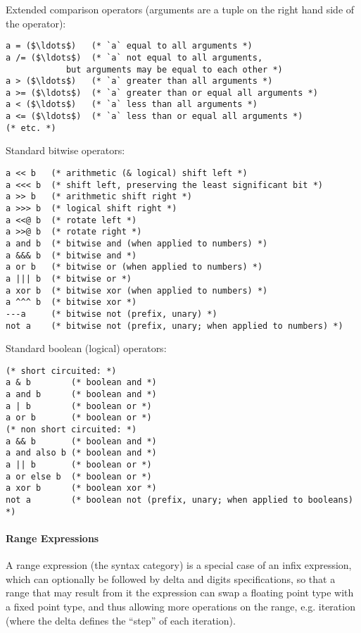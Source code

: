 Extended comparison operators (arguments are a tuple on the right hand side of the operator):
\begin{lstlisting}
a = ($\ldots$)   (* `a` equal to all arguments *)
a /= ($\ldots$)  (* `a` not equal to all arguments,
            but arguments may be equal to each other *)
a > ($\ldots$)   (* `a` greater than all arguments *)
a >= ($\ldots$)  (* `a` greater than or equal all arguments *)
a < ($\ldots$)   (* `a` less than all arguments *)
a <= ($\ldots$)  (* `a` less than or equal all arguments *)
(* etc. *)
\end{lstlisting}

Standard bitwise operators: 
\begin{lstlisting}
a << b   (* arithmetic (& logical) shift left *)
a <<< b  (* shift left, preserving the least significant bit *)
a >> b   (* arithmetic shift right *)
a >>> b  (* logical shift right *)
a <<@ b  (* rotate left *)
a >>@ b  (* rotate right *)
a and b  (* bitwise and (when applied to numbers) *)
a &&& b  (* bitwise and *)
a or b   (* bitwise or (when applied to numbers) *)
a ||| b  (* bitwise or *)
a xor b  (* bitwise xor (when applied to numbers) *)
a ^^^ b  (* bitwise xor *)
---a     (* bitwise not (prefix, unary) *)
not a    (* bitwise not (prefix, unary; when applied to numbers) *)
\end{lstlisting}

Standard boolean (logical) operators:
\begin{lstlisting}
(* short circuited: *)
a & b        (* boolean and *)
a and b      (* boolean and *)
a | b        (* boolean or *)
a or b       (* boolean or *)
(* non short circuited: *)
a && b       (* boolean and *)
a and also b (* boolean and *)
a || b       (* boolean or *)
a or else b  (* boolean or *)
a xor b      (* boolean xor *)
not a        (* boolean not (prefix, unary; when applied to booleans) *)
\end{lstlisting}






\paragraph{Range Expressions}
A range expression (the  syntax category) is a special case of an infix expression, which can optionally be followed by delta and digits specifications, so that a range that may result from it the expression can swap a floating point type with a fixed point type, and thus allowing more operations on the range, e.g. iteration (where the delta defines the ``step'' of each iteration). 

